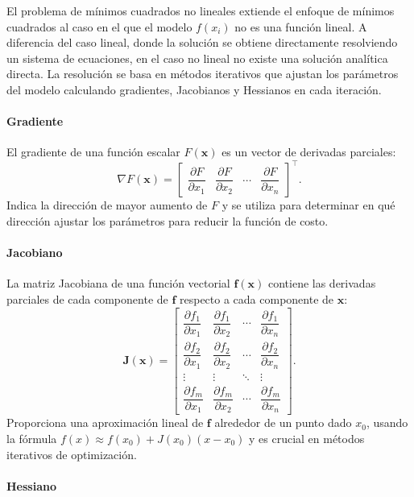 El problema de mínimos cuadrados no lineales extiende el enfoque de mínimos cuadrados al caso en el que el modelo $f(x_i)$ no es una función lineal. A diferencia del caso lineal, donde la solución se obtiene directamente resolviendo un sistema de ecuaciones, en el caso no lineal no existe una solución analítica directa. La resolución se basa en métodos iterativos que ajustan los parámetros del modelo calculando gradientes, Jacobianos y Hessianos en cada iteración.

\paragraph{Gradiente}

El gradiente de una función escalar $F(\mathbf{x})$ es un vector de derivadas parciales:
\[
\nabla F(\mathbf{x}) =
\begin{bmatrix}
\dfrac{\partial F}{\partial x_1} &
\dfrac{\partial F}{\partial x_2} &
\cdots &
\dfrac{\partial F}{\partial x_n}
\end{bmatrix}^\top.
\]
Indica la dirección de mayor aumento de $F$ y se utiliza para determinar en qué dirección ajustar los parámetros para reducir la función de costo.

\paragraph{Jacobiano}

La matriz Jacobiana de una función vectorial $\mathbf{f}(\mathbf{x})$ contiene las derivadas parciales de cada componente de $\mathbf{f}$ respecto a cada componente de $\mathbf{x}$:
\[
\mathbf{J}(\mathbf{x}) =
\begin{bmatrix}
\dfrac{\partial f_1}{\partial x_1} & \dfrac{\partial f_1}{\partial x_2} & \cdots & \dfrac{\partial f_1}{\partial x_n} \\[8pt]
\dfrac{\partial f_2}{\partial x_1} & \dfrac{\partial f_2}{\partial x_2} & \cdots & \dfrac{\partial f_2}{\partial x_n} \\[8pt]
\vdots & \vdots & \ddots & \vdots \\[4pt]
\dfrac{\partial f_m}{\partial x_1} & \dfrac{\partial f_m}{\partial x_2} & \cdots & \dfrac{\partial f_m}{\partial x_n}
\end{bmatrix}.
\]
Proporciona una aproximación lineal de $\mathbf{f}$ alrededor de un punto dado $x_0$, usando la fórmula $f(x) \approx f(x_0) + J(x_0)(x - x_0)$ y es crucial en métodos iterativos de optimización.

\paragraph{Hessiano}

